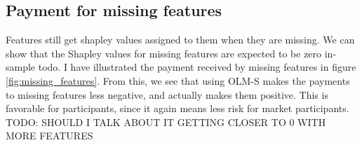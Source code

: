 
\subsection{Payment for missing features}

Features still get shapley values assigned to them when they are missing. We
can show that the Shapley values for missing features are expected to be zero
in-sample todo. I have illustrated the payment received by missing features in figure \ref{fig:missing_features}. From this, we see that using OLM-S makes the payments to missing features less negative, and actually makes them positive. This is favorable for participants, since it again means less risk for market participants. TODO: SHOULD I TALK ABOUT IT GETTING CLOSER TO 0 WITH MORE FEATURES


